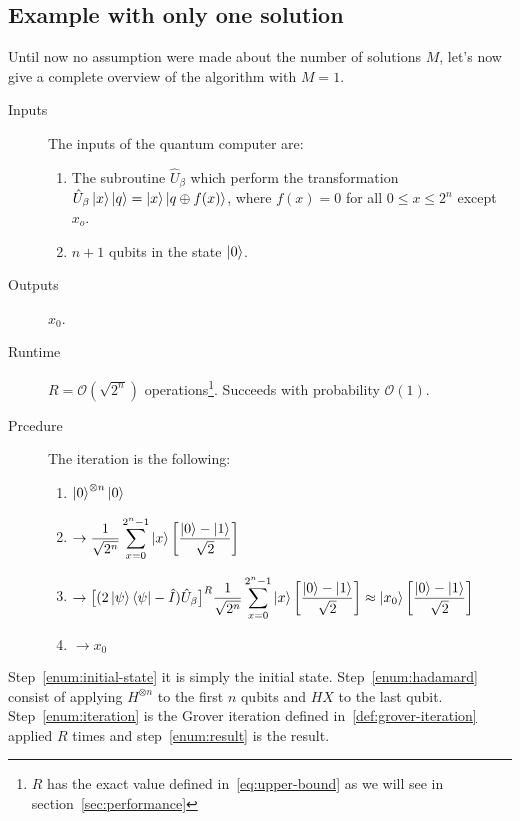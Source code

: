 \subsection{Example with only one solution}
Until now no assumption were made about the number of solutions $M$, let's now give a complete overview of the algorithm with $M=1$.
\begin{description}
   \item[Inputs] The inputs of the quantum computer are:
    \begin{enumerate}
  \item The subroutine $\hat{U}_\beta$ which perform the transformation $\hat{U}_\beta\ket{x}\ket{q} = \ket{x}\ket{q \oplus f(x)}$, where $f(x) = 0$ for all $0 \leq x \leq 2^n$ except $x_o$.
  \item $n+1$ qubits in the state $\ket{0}$.
\end{enumerate}
   \item[Outputs] $x_0$.
   \item[Runtime] $R = \mathcal{O}(\sqrt{2^n})$ operations\footnote{$R$ has the exact value defined in~\ref{eq:upper-bound} as we will see in section~\ref{sec:performance}}. Succeeds with probability $\mathcal{O}(1)$.
   \item[Prcedure] The iteration is the following:
   \begin{enumerate}
  \item $\ket{0}^{\otimes n} \ket{0}$ \label{enum:initial-state}
  \item $\begin{aligned} \rightarrow \frac{1}{\sqrt{2^n}} \sum_{x=0}^{2^n-1}\ket{x} \biggl[\frac{\ket{0}-\ket{1}}{\sqrt{2}}\biggr] \end{aligned}$ \label{enum:hadamard}
  \item $\begin{aligned} \rightarrow \bigl[(2 \ket{\psi}\bra{\psi} - \hat{I})\hat{U}_\beta\bigr]^R \frac{1}{\sqrt{2^n}} \sum_{x=0}^{2^n-1}\ket{x} \biggl[\frac{\ket{0}-\ket{1}}{\sqrt{2}}\biggr] \approx \ket{x_0} \biggl[\frac{\ket{0}-\ket{1}}{\sqrt{2}}\biggr] \end{aligned}$ \label{enum:iteration}
  \item $\rightarrow x_0$ \label{enum:result}
\end{enumerate}
\end{description}

Step~\ref{enum:initial-state} it is simply the initial state. Step~\ref{enum:hadamard} consist of applying $H^{\otimes n}$ to the first $n$ qubits and $H X$ to the last qubit. Step~\ref{enum:iteration} is the Grover iteration defined in~\ref{def:grover-iteration} applied $R$ times and step~\ref{enum:result} is the result.


